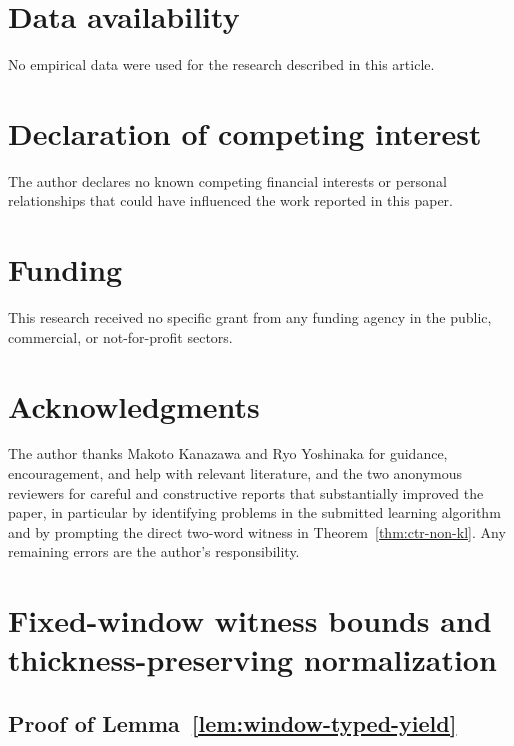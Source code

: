 \documentclass[11pt,a4paper]{article}
\theoremstyle{remark}
\theoremstyle{plain}
\begin{document}
\section*{Data availability}
No empirical data were used for the research described in this article.

\section*{Declaration of competing interest}
The author declares no known competing financial interests or personal
relationships that could have influenced the work reported in this paper.

\section*{Funding}
This research received no specific grant from any funding agency in the
public, commercial, or not-for-profit sectors.

\section*{Acknowledgments}
The author thanks Makoto Kanazawa and Ryo Yoshinaka for guidance,
encouragement, and help with relevant literature, and the two anonymous
reviewers for careful and constructive reports that substantially improved
the paper, in particular by identifying problems in the submitted learning
algorithm and by prompting the direct two-word witness in
Theorem~\ref{thm:ctr-non-kl}.  Any remaining errors are the author's
responsibility.

\appendix
\section{Fixed-window witness bounds and thickness-preserving normalization}
\label{app:fixed-window-bounds}

\subsection{Proof of Lemma~\ref{lem:window-typed-yield}}
\end{document}
